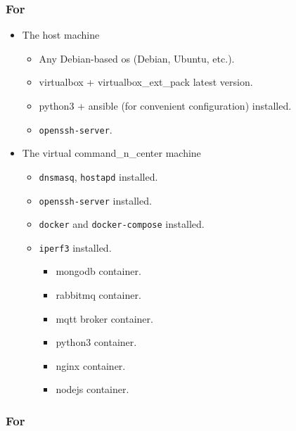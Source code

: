 \subsubsection{For  }\label{for-command-center-cnc}

\begin{itemize}
\tightlist
\item
  The host machine

\begin{itemize}
	\tightlist
	\item
	Any Debian-based \acrshort{os} (Debian, Ubuntu, etc.).
	\item
	\gls{virtualbox} + \gls{virtualbox_ext_pack} latest version.
	\item
	\gls{python3} + \gls{ansible} (for convenient configuration) installed.
	\item
	\texttt{openssh-server}.
\end{itemize}
\item
  The virtual \gls{command_n_center} machine

  \begin{itemize}
  \tightlist
  \item
    \texttt{dnsmasq}, \texttt{hostapd} installed.
  \item
    \texttt{openssh-server} installed.
  \item
    \texttt{docker} and \texttt{docker-compose} installed.
  \item
  	\texttt{iperf3} installed.

    \begin{itemize}
    \tightlist
    \item
      \gls{mongodb} container.
    \item
      \gls{rabbitmq} container.
    \item
      \gls{mqtt} broker container.
    \item
      \gls{python3} container.
    \item
      \gls{nginx} container.
    \item
      \gls{nodejs} container.
    \end{itemize}
  \end{itemize}
\end{itemize}

\subsubsection{For }\label{for-aps}

